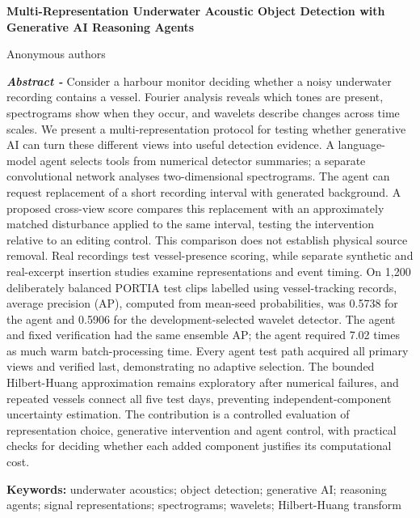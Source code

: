 \documentclass[11pt,letterpaper]{article}
\newcommand{\drafttitle}[1]{\begin{center}\sffamily\bfseries\fontsize{16}{19}\selectfont #1\end{center}}
\begin{document}
\fontsize{11}{13}\selectfont

\nocite{portia,signals1,signals2,uabench,physicsgen,huang1998,flowmatching,qwen,waveletship,uniqueship,speechocean,wav2vec2}

\drafttitle{Multi-Representation Underwater Acoustic Object Detection with Generative AI Reasoning Agents}

\begin{center}Anonymous authors\end{center}

{\fontsize{10}{11.5}\selectfont\noindent \textbf{\textit{Abstract - }}Consider a harbour monitor deciding whether a noisy underwater recording contains a vessel. Fourier analysis reveals which tones are present, spectrograms show when they occur, and wavelets describe changes across time scales. We present a multi-representation protocol for testing whether generative AI can turn these different views into useful detection evidence. A language-model agent selects tools from numerical detector summaries; a separate convolutional network analyses two-dimensional spectrograms. The agent can request replacement of a short recording interval with generated background. A proposed cross-view score compares this replacement with an approximately matched disturbance applied to the same interval, testing the intervention relative to an editing control. This comparison does not establish physical source removal. Real recordings test vessel-presence scoring, while separate synthetic and real-excerpt insertion studies examine representations and event timing. On 1,200 deliberately balanced PORTIA test clips labelled using vessel-tracking records, average precision (AP), computed from mean-seed probabilities, was 0.5738 for the agent and 0.5906 for the development-selected wavelet detector. The agent and fixed verification had the same ensemble AP; the agent required 7.02 times as much warm batch-processing time. Every agent test path acquired all primary views and verified last, demonstrating no adaptive selection. The bounded Hilbert-Huang approximation remains exploratory after numerical failures, and repeated vessels connect all five test days, preventing independent-component uncertainty estimation. The contribution is a controlled evaluation of representation choice, generative intervention and agent control, with practical checks for deciding whether each added component justifies its computational cost.\par}

{\fontsize{9}{11}\selectfont\noindent \textbf{Keywords:} underwater acoustics; object detection; generative AI; reasoning agents; signal representations; spectrograms; wavelets; Hilbert-Huang transform\par}
\end{document}
